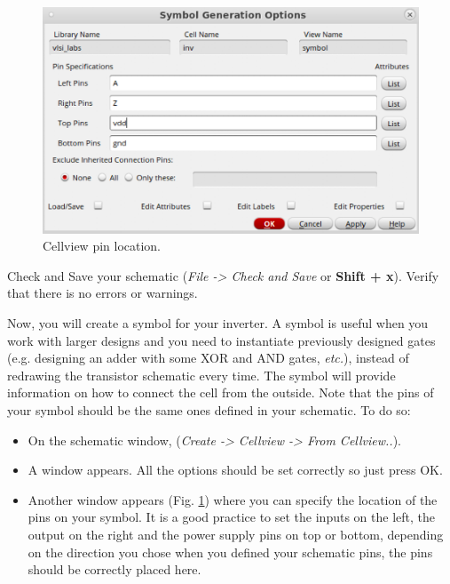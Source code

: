 \begin{enumerate}
	
	\parbox[t]{\dimexpr\textwidth-\leftmargin}{%
		\begin{figure}
			\vspace{-0mm}
			\centering
			\vspace{-\baselineskip}
			\includegraphics[scale=0.4]{figures/lab1_schematic_sim/cellview}
			\caption{Cellview pin location.}
			\label{fig_cellview}
		\end{figure}
		\item Check and Save your schematic (\textit{File -> Check and Save} or \textbf{Shift + x}). Verify that there is no errors or warnings.
		\item Now, you will create a symbol for your inverter. A symbol is useful when you work with larger designs and you need to instantiate previously designed gates (e.g. designing an adder with some XOR and AND gates, \textit{etc.}), instead of redrawing the transistor schematic every time. The symbol will provide information on how to connect the cell from the outside. Note that the pins of your symbol should be the same ones defined in your schematic. To do so: 
		\begin{itemize}
			\item On the schematic window, (\textit{Create -> Cellview -> From Cellview..}). 
	\end{itemize} } 
	\begin{itemize}
		\item A window appears. All the options should be set correctly so just press OK.
		\item Another window appears (Fig. \ref{fig_cellview}) where you can specify the location of the pins on your symbol. It is a good practice to set the inputs on the left, the output on the right and the power supply pins on top or bottom, depending on the direction you chose when you defined your schematic pins, the pins should be correctly placed here.		

\end{itemize}
\end{enumerate}
